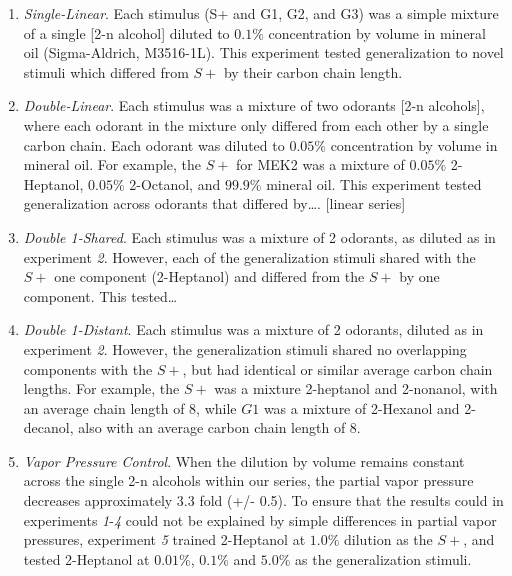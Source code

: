 \begin{enumerate}
\item \textit{Single-Linear}. Each stimulus (S+ and G1, G2, and G3) was a simple mixture of a single [2-n alcohol] diluted to $0.1\%$ concentration by volume in mineral oil (Sigma-Aldrich, M3516-1L). This experiment tested generalization to novel stimuli which differed from $S+$ by their carbon chain length.

\item \textit{Double-Linear}. Each stimulus was a mixture of two odorants [2-n alcohols], where each odorant in the mixture only differed from each other by a single carbon chain. Each odorant was diluted to $0.05\%$ concentration by volume in mineral oil. For example, the $S+$ for MEK2 was a mixture of $0.05\%$ 2-Heptanol, $0.05\%$ 2-Octanol, and $99.9\%$ mineral oil.  This experiment tested generalization across odorants that differed by…. [linear series]

\item \textit{Double 1-Shared}. Each stimulus was a mixture of 2 odorants, as diluted as in experiment \textit{2}. However, each of the generalization stimuli shared with the $S+$ one component (2-Heptanol) and differed from the $S+$ by one component. This tested…

\item \textit{Double 1-Distant}. Each stimulus was a mixture of 2 odorants, diluted as in experiment \textit{2}. However, the generalization stimuli shared no overlapping components with the $S+$, but had identical or similar average carbon chain lengths. For example, the $S+$ was a mixture 2-heptanol and 2-nonanol, with an average chain length of 8, while $G1$ was a mixture of 2-Hexanol and 2-decanol, also with an average carbon chain length of 8.

\item \textit{Vapor Pressure Control}. When the dilution by volume remains constant across the single 2-n alcohols within our series, the partial vapor pressure decreases approximately 3.3 fold (+/- 0.5). To ensure that the results could in experiments \textit{1}-\textit{4} could not be explained by simple differences in partial vapor pressures, experiment \textit{5} trained 2-Heptanol at $1.0\%$ dilution as the $S+$, and tested 2-Heptanol at $0.01\%$, $0.1\%$ and $5.0\%$ as the generalization stimuli.
\end{enumerate}
